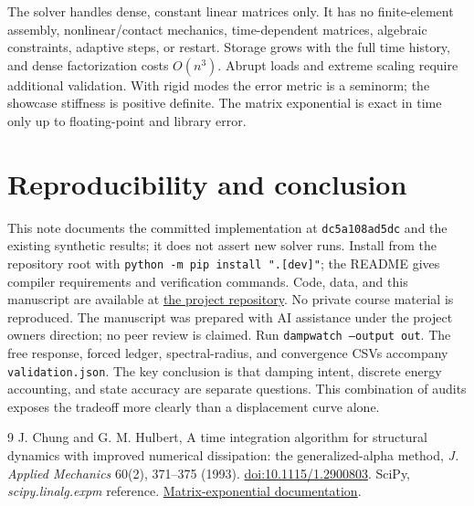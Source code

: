 \documentclass[10pt,a4paper]{article}
\begin{document}
The solver handles dense, constant linear matrices only. It has no finite-element assembly, nonlinear/contact mechanics, time-dependent matrices, algebraic constraints, adaptive steps, or restart. Storage grows with the full time history, and dense factorization costs $O(n^3)$. Abrupt loads and extreme scaling require additional validation. With rigid modes the error metric is a seminorm; the showcase stiffness is positive definite. The matrix exponential is exact in time only up to floating-point and library error.
\section{Reproducibility and conclusion}
This note documents the committed implementation at \texttt{dc5a108ad5dc} and the existing synthetic results; it does not assert new solver runs. Install from the repository root with \texttt{python -m pip install ".[dev]"}; the README gives compiler requirements and verification commands. Code, data, and this manuscript are available at \href{https://github.com/racostacme-come/dampwatch}{the project repository}. No private course material is reproduced. The manuscript was prepared with AI assistance under the project owner\textquotesingle s direction; no peer review is claimed.
Run \texttt{dampwatch --output out}. The free response, forced ledger, spectral-radius, and convergence CSVs accompany \texttt{validation.json}. The key conclusion is that damping intent, discrete energy accounting, and state accuracy are separate questions. This combination of audits exposes the tradeoff more clearly than a displacement curve alone.
\begin{thebibliography}{9}
 J. Chung and G. M. Hulbert, A time integration algorithm for structural dynamics with improved numerical dissipation: the generalized-alpha method, \emph{J. Applied Mechanics} 60(2), 371--375 (1993). \href{https://doi.org/10.1115/1.2900803}{doi:10.1115/1.2900803}.
 SciPy, \emph{scipy.linalg.expm} reference. \href{https://docs.scipy.org/doc/scipy/reference/generated/scipy.linalg.expm.html}{Matrix-exponential documentation}.
\end{thebibliography}
\end{document}
